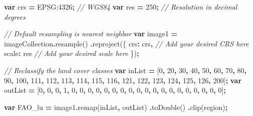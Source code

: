 \documentclass[
  10pt,
  b5paper,
  oneside]{book}
\newenvironment{Shaded}{\begin{snugshade}}{\end{snugshade}}
\newcommand{\CommentTok}[1]{\textcolor[rgb]{0.56,0.35,0.01}{\textit{#1}}}
\newcommand{\DataTypeTok}[1]{\textcolor[rgb]{0.13,0.29,0.53}{#1}}
\newcommand{\DecValTok}[1]{\textcolor[rgb]{0.00,0.00,0.81}{#1}}
\newcommand{\FunctionTok}[1]{\textcolor[rgb]{0.00,0.00,0.00}{#1}}
\newcommand{\KeywordTok}[1]{\textcolor[rgb]{0.13,0.29,0.53}{\textbf{#1}}}
\newcommand{\NormalTok}[1]{#1}
\newcommand{\OperatorTok}[1]{\textcolor[rgb]{0.81,0.36,0.00}{\textbf{#1}}}
\newcommand{\StringTok}[1]{\textcolor[rgb]{0.31,0.60,0.02}{#1}}
\begin{document}
\begin{Shaded}
\begin{Highlighting}[]
\KeywordTok{var}\NormalTok{ crs }\OperatorTok{=} \StringTok{\textquotesingle{}EPSG:4326\textquotesingle{}}\OperatorTok{;} \CommentTok{// WGS84}
\KeywordTok{var}\NormalTok{ res }\OperatorTok{=} \DecValTok{250}\OperatorTok{;} \CommentTok{// Resolution in decimal degrees}

\CommentTok{// Default resampling is nearest neighbor}
\KeywordTok{var}\NormalTok{ image1 }\OperatorTok{=}\NormalTok{ imageCollection}\OperatorTok{.}\FunctionTok{resample}\NormalTok{()}
  \OperatorTok{.}\FunctionTok{reproject}\NormalTok{(\{}
    \DataTypeTok{crs}\OperatorTok{:}\NormalTok{ crs}\OperatorTok{,} \CommentTok{// Add your desired CRS here}
    \DataTypeTok{scale}\OperatorTok{:}\NormalTok{ res }\CommentTok{// Add your desired scale here}
\NormalTok{  \})}\OperatorTok{;}

\CommentTok{// Reclassify the land cover classes}
\KeywordTok{var}\NormalTok{ inList }\OperatorTok{=}\NormalTok{ [}\DecValTok{0}\OperatorTok{,} \DecValTok{20}\OperatorTok{,} \DecValTok{30}\OperatorTok{,} \DecValTok{40}\OperatorTok{,} \DecValTok{50}\OperatorTok{,} \DecValTok{60}\OperatorTok{,} \DecValTok{70}\OperatorTok{,} \DecValTok{80}\OperatorTok{,} \DecValTok{90}\OperatorTok{,} \DecValTok{100}\OperatorTok{,} 
               \DecValTok{111}\OperatorTok{,} \DecValTok{112}\OperatorTok{,} \DecValTok{113}\OperatorTok{,} \DecValTok{114}\OperatorTok{,} \DecValTok{115}\OperatorTok{,} \DecValTok{116}\OperatorTok{,} 
              \DecValTok{121}\OperatorTok{,} \DecValTok{122}\OperatorTok{,} \DecValTok{123}\OperatorTok{,} \DecValTok{124}\OperatorTok{,} \DecValTok{125}\OperatorTok{,} \DecValTok{126}\OperatorTok{,} \DecValTok{200}\NormalTok{]}\OperatorTok{;}
\KeywordTok{var}\NormalTok{ outList }\OperatorTok{=}\NormalTok{ [}\DecValTok{0}\OperatorTok{,} \DecValTok{0}\OperatorTok{,} \DecValTok{0}\OperatorTok{,} \DecValTok{1}\OperatorTok{,} \DecValTok{0}\OperatorTok{,} \DecValTok{0}\OperatorTok{,} \DecValTok{0}\OperatorTok{,} \DecValTok{0}\OperatorTok{,} \DecValTok{0}\OperatorTok{,} \DecValTok{0}\OperatorTok{,} \DecValTok{0}\OperatorTok{,} \DecValTok{0}\OperatorTok{,}
               \DecValTok{0}\OperatorTok{,} \DecValTok{0}\OperatorTok{,} \DecValTok{0}\OperatorTok{,} \DecValTok{0}\OperatorTok{,} \DecValTok{0}\OperatorTok{,} \DecValTok{0}\OperatorTok{,} \DecValTok{0}\OperatorTok{,} \DecValTok{0}\OperatorTok{,} \DecValTok{0}\OperatorTok{,} \DecValTok{0}\OperatorTok{,} \DecValTok{0}\NormalTok{]}\OperatorTok{;}

\KeywordTok{var}\NormalTok{ FAO\_lu }\OperatorTok{=}\NormalTok{ image1}\OperatorTok{.}\FunctionTok{remap}\NormalTok{(inList}\OperatorTok{,}\NormalTok{ outList)}
  \OperatorTok{.}\FunctionTok{toDouble}\NormalTok{()}
  \OperatorTok{.}\FunctionTok{clip}\NormalTok{(region)}\OperatorTok{;}


\end{Highlighting}
\end{Shaded}
\end{document}
